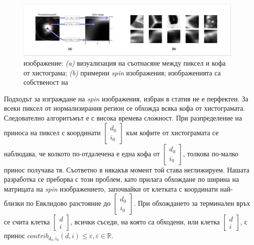 \documentclass[a4paper,12pt]{article}
\begin{document}
\begin{figure}[h]
    \centering
    \includegraphics[width=\textwidth]{spin_image.png}
    \caption{ изображение: \textit{(a)} визуализация на съотнасяне между пиксел и кофа от хистограма; \textit{(b)} примерни \textit{spin} изображения; изображенията са собственост на \cite{spinimages}}
    \label{fig:spinim}
\end{figure}

\bigbreak

Подходът за изграждане на \textit{spin} изображения, избран в статия \cite{spinimages} не е перфектен. За всеки пиксел от нормализирания регион се обхожда всяка кофа от хистограмата. Следователно алгоритъмът е с висока времева сложност. При разпределение на приноса на пиксел с координати $\begin{bmatrix} d_0 \\ i_0 \end{bmatrix}$ към кофите от хистограмата се наблюдава, че колкото по-отдалечена е една кофа от $\begin{bmatrix} d_0 \\ i_0 \end{bmatrix}$, толкова по-малко принос получава тя. Съответно в някакъв момент той става неглижируем. Нашата разработка се преборва с този проблем, като прилага обхождане по ширина на матрицата на \textit{spin} изображението, започвайки от клетката с координати най-близки по Евклидово разстояние до $\begin{bmatrix} d_0 \\ i_0 \end{bmatrix}$. При обхождането за терминален връх се счита клетка $\begin{bmatrix} d \\ i \end{bmatrix}$, всички съседи, на която са обходени, или клетка $\begin{bmatrix} d \\ i \end{bmatrix}$, с принос $contrib_{d_0,i_0}(d, i) \leq \varepsilon, \varepsilon \in \mathbb{R}$.

\bigbreak
\end{document}
